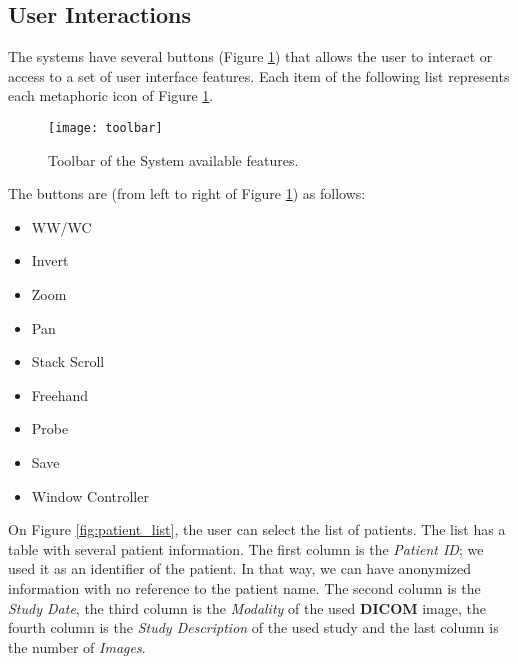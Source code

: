 
\subsection{User Interactions}

The systems have several buttons (Figure \ref{fig:toolbar}) that allows the user to interact or access to a set of user interface features. Each item of the following list represents each metaphoric icon of Figure \ref{fig:toolbar}.


\hfill

\begin{figure}[h]
\centering
\texttt{[image: toolbar]}
\caption{Toolbar of the System available features.}
\label{fig:toolbar}
\end{figure}

\hfill


The buttons are (from left to right of Figure \ref{fig:toolbar}) as follows:

\hfill

\begin{itemize}
\item WW/WC
\item Invert
\item Zoom
\item Pan
\item Stack Scroll
\item Freehand
\item Probe
\item Save
\item Window Controller
\end{itemize}

\hfill


On Figure \ref{fig:patient_list}, the user can select the list of patients. The list has a table with several patient information. The first column is the \textit{Patient ID}; we used it as an identifier of the patient. In that way, we can have anonymized information with no reference to the patient name. The second column is the \textit{Study Date}, the third column is the \textit{Modality} of the used \textbf{DICOM} image, the fourth column is the \textit{Study Description} of the used study and the last column is the number of \textit{Images}.

